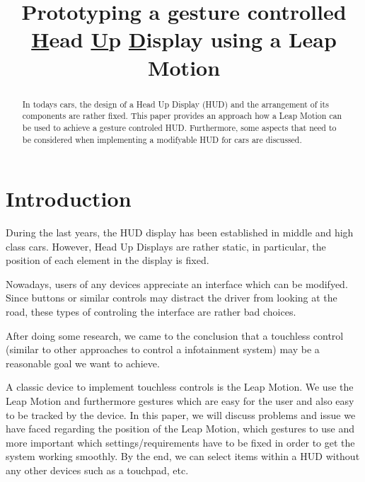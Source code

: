 \documentclass{sigchi-ext}
\title{Prototyping a gesture controlled \underline{H}ead \underline{U}p \underline{D}isplay using a Leap Motion}
\author{%
  \alignauthor{%
    \textbf{Daniel Brand}\\
    \affaddr{University of Salzburg} \\
    \affaddr{Salzburg, 5020, AUT} \\
    \email{Daniel.Brand@stud.sbg.ac.at} 
}
\alignauthor{%
    \textbf{Kevin B\"uchele}\\
    \affaddr{University of Salzburg}\\
    \affaddr{Salzburg, 5020, AUT}\\
    \email{Kevin.Buechele@stud.sbg.ac.at} 
} \vfil 
}
\begin{document}
\maketitle

\RaggedRight{} 

\begin{abstract}
In todays cars, the design of a Head Up Display (HUD) and
the arrangement of its components are rather fixed. This paper provides an approach
how a Leap Motion can be used to achieve a gesture controled HUD. Furthermore, some aspects that need to be considered
when implementing a modifyable HUD for cars are discussed.
\end{abstract}


\section{Introduction}
During the last years, the HUD display has been established in middle and high class cars.
However, Head Up Displays are rather static, in particular, the position of each element in the display
is fixed.\linebreak

Nowadays, users of any devices appreciate an interface which can be modifyed.
Since buttons or similar controls may distract the driver from looking at the road,
these types of controling the interface are rather bad choices.\linebreak

After doing some research, we came to the conclusion that a touchless control
(similar to other approaches to control a infotainment system)
may be a reasonable goal we want to achieve.\linebreak

A classic device to implement touchless controls is the Leap Motion. We use the Leap Motion
and furthermore gestures which are easy for the user and also easy to be tracked by the device.
In this paper, we will discuss problems and issue we have faced regarding the position of
the Leap Motion, which gestures to use and more important which settings/requirements have to be fixed
in order to get the system working smoothly. By the end, we can select items within a HUD
without any other devices such as a touchpad, etc.
\end{document}

